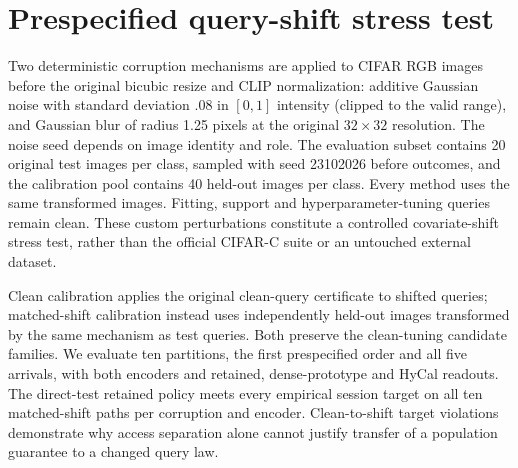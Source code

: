 \documentclass[preprint,review,12pt]{elsarticle}
\begin{document}
\begin{table}[htbp]
\centering\setlength{\belowcaptionskip}{8pt}
\caption{B32, Pets: sufficient protection and direct paired accuracy calibration. Accuracy columns are percentages; both admission and fallback are explicit.}
\resizebox{\linewidth}{!}{}
\end{table}
\begin{table}[htbp]
\centering\setlength{\belowcaptionskip}{8pt}
\caption{B32, ImageNet-R: sufficient protection and direct paired accuracy calibration. Accuracy columns are percentages; both admission and fallback are explicit.}
\resizebox{\linewidth}{!}{}
\end{table}

\FloatBarrier
\section{Prespecified query-shift stress test}
\label{app:shiftrevision}
Two deterministic corruption mechanisms are applied to CIFAR RGB images before the original bicubic resize and CLIP normalization: additive Gaussian noise with standard deviation .08 in $[0,1]$ intensity (clipped to the valid range), and Gaussian blur of radius 1.25 pixels at the original $32\times32$ resolution. The noise seed depends on image identity and role. The evaluation subset contains 20 original test images per class, sampled with seed 23102026 before outcomes, and the calibration pool contains 40 held-out images per class. Every method uses the same transformed images. Fitting, support and hyperparameter-tuning queries remain clean. These custom perturbations constitute a controlled covariate-shift stress test, rather than the official CIFAR-C suite or an untouched external dataset.

Clean calibration applies the original clean-query certificate to shifted queries; matched-shift calibration instead uses independently held-out images transformed by the same mechanism as test queries. Both preserve the clean-tuning candidate families. We evaluate ten partitions, the first prespecified order and all five arrivals, with both encoders and retained, dense-prototype and HyCal readouts. The direct-test retained policy meets every empirical session target on all ten matched-shift paths per corruption and encoder. Clean-to-shift target violations demonstrate why access separation alone cannot justify transfer of a population guarantee to a changed query law.
\end{document}
